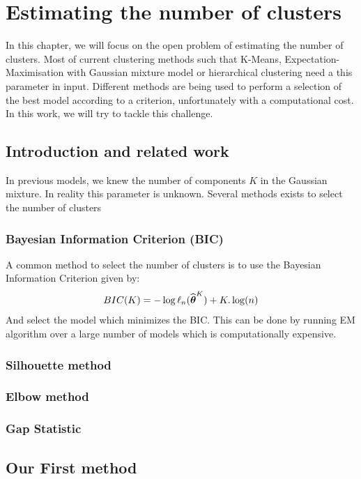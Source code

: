 
\chapter{Estimating the number of clusters}

In this chapter, we will focus on the open problem of estimating the number of clusters. Most of current clustering methods such that K-Means, Expectation-Maximisation with Gaussian mixture model or hierarchical clustering need a this parameter in input. Different methods are being used to perform a selection of the best model according to a criterion, unfortunately with a computational cost. In this work, we will try to tackle this challenge.

\section{Introduction and related work}
In previous models, we knew the number of components $K$ in the Gaussian mixture. In reality this parameter is unknown. 
Several methods exists to select the number of clusters

\subsection{Bayesian Information Criterion (BIC)}
A common method to select the number of clusters is to use the Bayesian Information Criterion given by:
\begin{equation}
  BIC(K) = -\log\ell_n(\widehat{{\boldsymbol\theta}}^K)+K.\log(n)
\end{equation}
And select the model which minimizes the BIC. This can be done by running EM algorithm over a large number of models which is computationally expensive.
\subsection{Silhouette method}

\subsection{Elbow method}

\subsection{Gap Statistic}

\section{Our First method}

